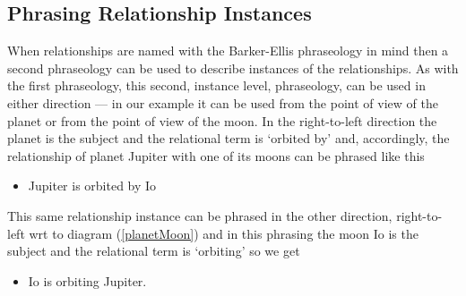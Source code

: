 \subsection{Phrasing Relationship Instances}
\mynote
When relationships are named with the 
Barker-Ellis phraseology in mind  then a second phraseology can be used to describe instances of the relationships. 
As with the first phraseology, this second, instance level, phraseology,
 can be used in either direction
 --- in our example it can be used from the point of view
of the planet or from the point of view of the moon.
In the right-to-left direction the planet is the subject and the relational term is
`orbited by' and, accordingly, the relationship of planet Jupiter with one of its moons can be phrased like this
\begin{itemize}
\renewcommand\labelitemi{--}
\item Jupiter is orbited by Io
\end{itemize}

This same relationship instance can be phrased in the other direction, right-to-left wrt to diagram (\ref{planetMoon}) and in this phrasing the moon Io is the subject and the relational term is `orbiting' so we get
\begin{itemize}
\renewcommand\labelitemi{--}
\item Io is orbiting  Jupiter.
\end{itemize}

